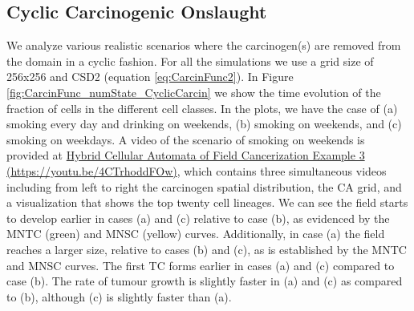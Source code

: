 \documentclass[\main/thesis.tex]{subfiles}
\begin{document}
\subsection{Cyclic Carcinogenic Onslaught}
We analyze various realistic scenarios where the carcinogen(s) are removed from the domain in a cyclic fashion. For all the simulations we use a grid size of 256x256 and CSD2 (equation \ref{eq:CarcinFunc2}). In Figure \ref{fig:CarcinFunc_numState_CyclicCarcin} we show the time evolution of the fraction of cells in the different cell classes. In the plots, we have the case of (a) smoking every day and drinking on weekends, (b) smoking on weekends, and (c) smoking on weekdays. A video of the scenario of smoking on weekends is provided at \href{https://youtu.be/4CTrhoddFOw}{Hybrid Cellular Automata of Field Cancerization Example 3 (https://youtu.be/4CTrhoddFOw)}, which contains three simultaneous videos including from left to right the carcinogen spatial distribution, the CA grid, and a visualization that shows the top twenty cell lineages.  We can see the field starts to develop earlier in cases (a) and (c) relative to case (b), as evidenced by the MNTC (green) and MNSC (yellow) curves. Additionally, in case (a) the field reaches a larger size, relative to cases (b) and (c), as is established by the MNTC and MNSC curves. The first TC forms earlier in cases (a) and (c) compared to case (b). The rate of tumour growth is slightly faster in (a) and (c) as compared to (b), although (c) is slightly faster than (a).
\end{document}

